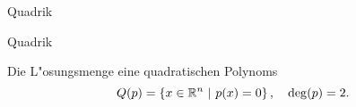 \documentclass[class=article, crop=false]{standalone}
\begin{document}
\begin{zettel}{Quadrik}
\begin{flashcard}[bagublze]{Quadrik}
	\begin{definition}
		Die L"osungsmenge eine quadratischen Polynoms
		\[
			Q(p)= \set{x \in  \R^n}{p(x) = 0}, \quad \deg(p)= 2
		.\]
	\end{definition}
\end{flashcard}
\end{zettel}
\end{document}
